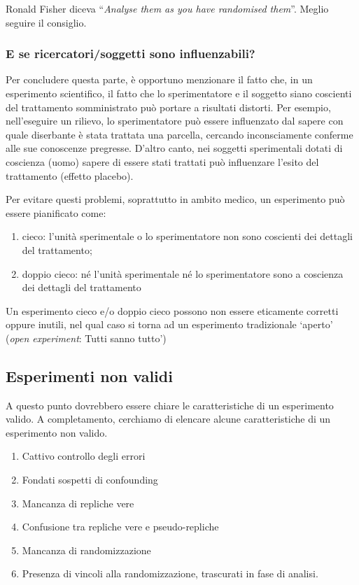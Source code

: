 \documentclass[a4paper,12pt,oneside]{book}
\providecommand{\tightlist}{%
  \setlength{\itemsep}{0pt}\setlength{\parskip}{0pt}}
\theoremstyle{definition}
\theoremstyle{definition}
\theoremstyle{definition}
\theoremstyle{remark}
\begin{document}
Ronald Fisher diceva ``\emph{Analyse them as you have randomised
them}''. Meglio seguire il consiglio.

\subsubsection{E se ricercatori/soggetti sono
influenzabili?}\label{e-se-ricercatorisoggetti-sono-influenzabili}

Per concludere questa parte, è opportuno menzionare il fatto che, in un
esperimento scientifico, il fatto che lo sperimentatore e il soggetto
siano coscienti del trattamento somministrato può portare a risultati
distorti. Per esempio, nell'eseguire un rilievo, lo sperimentatore può
essere influenzato dal sapere con quale diserbante è stata trattata una
parcella, cercando inconsciamente conferme alle sue conoscenze
pregresse. D'altro canto, nei soggetti sperimentali dotati di coscienza
(uomo) sapere di essere stati trattati può influenzare l'esito del
trattamento (effetto placebo).

Per evitare questi problemi, soprattutto in ambito medico, un
esperimento può essere pianificato come:

\begin{enumerate}
\def\labelenumi{\arabic{enumi}.}
\tightlist
\item
  cieco: l'unità sperimentale o lo sperimentatore non sono coscienti dei
  dettagli del trattamento;
\item
  doppio cieco: né l'unità sperimentale né lo sperimentatore sono a
  coscienza dei dettagli del trattamento
\end{enumerate}

Un esperimento cieco e/o doppio cieco possono non essere eticamente
corretti oppure inutili, nel qual caso si torna ad un esperimento
tradizionale `aperto' (\emph{open experiment}: Tutti sanno tutto')

\subsection{Esperimenti non validi}\label{esperimenti-non-validi}

A questo punto dovrebbero essere chiare le caratteristiche di un
esperimento valido. A completamento, cerchiamo di elencare alcune
caratteristiche di un esperimento non valido.

\begin{enumerate}
\def\labelenumi{\arabic{enumi}.}
\tightlist
\item
  Cattivo controllo degli errori
\item
  Fondati sospetti di confounding
\item
  Mancanza di repliche vere
\item
  Confusione tra repliche vere e pseudo-repliche
\item
  Mancanza di randomizzazione
\item
  Presenza di vincoli alla randomizzazione, trascurati in fase di
  analisi.
\end{enumerate}
\end{document}
